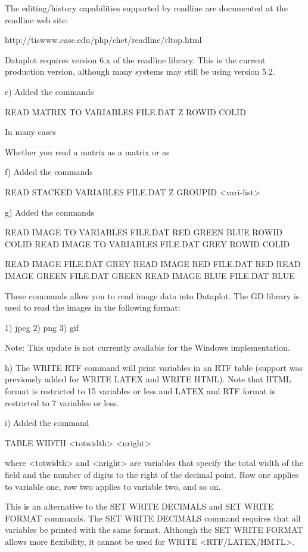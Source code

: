 {       The editing/history capabilities supported by readline are
       documented at the readline web site:

           http://tiswww.case.edu/php/chet/readline/rltop.html

       Dataplot requires version 6.x of the readline library.
       This is the current production version, although many
       systems may still be using version 5.2.

    e) Added the commands

         READ MATRIX TO VARIABLES FILE.DAT Z ROWID COLID

       In many cases

       Whether you read a matrix as a matrix or as 

    f) Added the commands

         READ STACKED VARIABLES FILE.DAT Z GROUPID <vari-list>

    g) Added the commands

         READ IMAGE TO VARIABLES FILE.DAT RED GREEN BLUE ROWID COLID
         READ IMAGE TO VARIABLES FILE.DAT GREY ROWID COLID

         READ IMAGE FILE.DAT GREY
         READ IMAGE RED FILE.DAT RED
         READ IMAGE GREEN FILE.DAT GREEN
         READ IMAGE BLUE FILE.DAT BLUE

       These commands allow you to read image data into Dataplot.
       The GD library is used to read the images in the following
       format:

          1) jpeg
          2) png
          3) gif

       Note: This update is not currently available for the
             Windows implementation.

    h) The WRITE RTF command will print variables in an RTF
       table (support was previously added for WRITE LATEX and
       WRITE HTML).  Note that HTML format is restricted to
       15 variables or less and LATEX and RTF format is
       restricted to 7 variables or less.

    i) Added the command

         TABLE WIDTH  <totwidth>   <nright>

       where <totwidth> and <nright> are variables that specify
       the total width of the field and the number of digits to
       the right of the decimal point.  Row one applies to
       variable one, row two applies to variable two, and so on.

       This is an alternative to the SET WRITE DECIMALS and
       SET WRITE FORMAT commands.  The SET WRITE DECIMALS command
       requires that all variables be printed with the same
       format.  Although the SET WRITE FORMAT allows more flexibility,
       it cannot be used for WRITE <RTF/LATEX/HMTL>.

}
